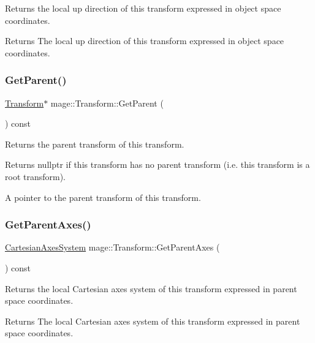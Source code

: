 Returns the local up direction of this transform expressed in object space coordinates.

\begin{DoxyReturn}{Returns}
The local up direction of this transform expressed in object space coordinates. 
\end{DoxyReturn}
\hypertarget{structmage_1_1_transform_a9ad6f03ef7e41ddfe1af7ac2dd0c263c}{}\label{structmage_1_1_transform_a9ad6f03ef7e41ddfe1af7ac2dd0c263c} 
\subsubsection{\texorpdfstring{Get\+Parent()}{GetParent()}}
{\footnotesize\ttfamily \hyperlink{structmage_1_1_transform}{Transform}$\ast$ mage\+::\+Transform\+::\+Get\+Parent (\begin{DoxyParamCaption}{ }\end{DoxyParamCaption}) const}

Returns the parent transform of this transform.

\begin{DoxyReturn}{Returns}
{\ttfamily nullptr} if this transform has no parent transform (i.\+e. this transform is a root transform). 

A pointer to the parent transform of this transform. 
\end{DoxyReturn}
\hypertarget{structmage_1_1_transform_acdd8950649ae1a779c254da82136033a}{}\label{structmage_1_1_transform_acdd8950649ae1a779c254da82136033a} 
\subsubsection{\texorpdfstring{Get\+Parent\+Axes()}{GetParentAxes()}}
{\footnotesize\ttfamily \hyperlink{structmage_1_1_cartesian_axes_system}{Cartesian\+Axes\+System} mage\+::\+Transform\+::\+Get\+Parent\+Axes (\begin{DoxyParamCaption}{ }\end{DoxyParamCaption}) const}

Returns the local Cartesian axes system of this transform expressed in parent space coordinates.

\begin{DoxyReturn}{Returns}
The local Cartesian axes system of this transform expressed in parent space coordinates. 
\end{DoxyReturn}
\hypertarget{structmage_1_1_transform_afd81bb8bef70bebc59df3ff157d53bc9}{}\label{structmage_1_1_transform_afd81bb8bef70bebc59df3ff157d53bc9} 
